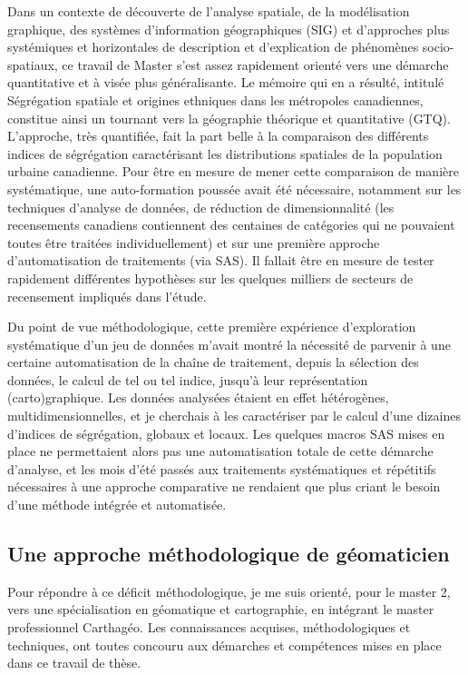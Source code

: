 Dans un contexte de découverte de l'analyse spatiale, de la modélisation graphique, des systèmes d'information géographiques (SIG) et d'approches plus systémiques et horizontales de description et d'explication de phénomènes socio-spatiaux, ce travail de Master s'est assez rapidement orienté vers une démarche quantitative et à visée plus généralisante.
Le mémoire qui en a résulté, intitulé \og Ségrégation spatiale et origines ethniques dans les métropoles canadiennes\fg{}, constitue ainsi un tournant vers la géographie théorique et quantitative (GTQ).
L'approche, très quantifiée, fait la part belle à la comparaison des différents indices de ségrégation caractérisant les distributions spatiales de la population urbaine canadienne.
Pour être en mesure de mener cette comparaison de manière systématique, une auto-formation poussée avait été nécessaire, notamment sur les techniques d'analyse de données, de réduction de dimensionnalité (les recensements canadiens contiennent des centaines de catégories qui ne pouvaient toutes être traitées individuellement) et sur une première approche d'automatisation de traitements (via SAS).
Il fallait être en mesure de tester rapidement différentes hypothèses sur les quelques milliers de \og secteurs de recensement\fg{} impliqués dans l'étude.

Du point de vue méthodologique, cette première expérience d'exploration systématique d'un jeu de données m'avait montré la nécessité de parvenir à une certaine automatisation de la chaîne de traitement, depuis la sélection des données, le calcul de tel ou tel indice, jusqu'à leur représentation (carto)graphique.
Les données analysées étaient en effet hétérogènes, multidimensionnelles, et je cherchais à les caractériser par le calcul d'une dizaines d'indices de ségrégation, globaux et locaux.
Les quelques macros SAS mises en place ne permettaient alors pas une automatisation totale de cette démarche d'analyse, et les mois d'été passés aux traitements systématiques et répétitifs nécessaires à une approche comparative ne rendaient que plus criant le besoin d'une méthode intégrée et automatisée.

\subsection{Une approche méthodologique de géomaticien}

Pour répondre à ce déficit méthodologique, je me suis orienté, pour le master 2, vers une spécialisation en géomatique et cartographie, en intégrant le master professionnel Carthagéo.
Les connaissances acquises, méthodologiques et techniques, ont toutes concouru aux démarches et compétences mises en place dans ce travail de thèse.

